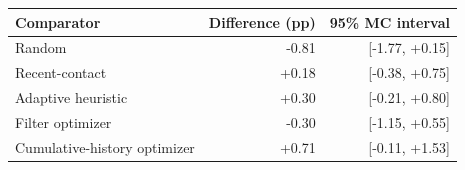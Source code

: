 \begin{tabular}{lrr}\toprule
Comparator & Difference (pp) & 95\% MC interval \\ \midrule
Random & -0.81 & [-1.77, +0.15] \\
Recent-contact & +0.18 & [-0.38, +0.75] \\
Adaptive heuristic & +0.30 & [-0.21, +0.80] \\
Filter optimizer & -0.30 & [-1.15, +0.55] \\
Cumulative-history optimizer & +0.71 & [-0.11, +1.53] \\
\bottomrule\end{tabular}